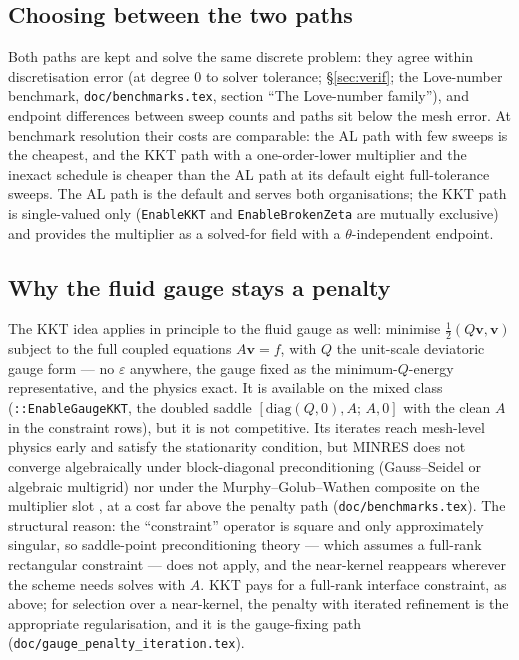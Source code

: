 \documentclass[11pt]{article}
\newcommand{\eps}{\varepsilon}
\newcommand{\bv}{\mathbf{v}}
\begin{document}
\subsection{Choosing between the two paths}

Both paths are kept and solve the same discrete problem: they agree
within discretisation error (at degree 0 to solver tolerance;
\S\ref{sec:verif}; the Love-number benchmark, \texttt{doc/benchmarks.tex},
section ``The Love-number family''), and endpoint differences between
sweep counts and paths sit below the mesh error. At benchmark
resolution their costs are comparable: the AL path with few sweeps is
the cheapest, and the KKT path with a one-order-lower multiplier and the
inexact schedule is cheaper than the AL path at its default eight
full-tolerance sweeps. The AL path is the default and serves both
organisations; the KKT path is single-valued only (\texttt{EnableKKT}
and \texttt{EnableBrokenZeta} are mutually exclusive) and provides the
multiplier as a solved-for field with a $\theta$-independent endpoint.

\subsection{Why the fluid gauge stays a penalty}
\label{sec:gaugekkt}

The KKT idea applies in principle to the fluid gauge as well: minimise
$\tfrac12 (Q\bv, \bv)$ subject to the full coupled equations
$A\bv = f$, with $Q$ the unit-scale deviatoric gauge form --- no $\eps$
anywhere, the gauge fixed as the minimum-$Q$-energy representative, and
the physics exact. It is available on the mixed class
(\texttt{::EnableGaugeKKT},
the doubled saddle $[\mathrm{diag}(Q,0), A;\, A, 0]$ with the clean $A$
in the constraint rows), but it is not competitive. Its iterates reach
mesh-level physics early and satisfy the stationarity condition, but
MINRES does not converge algebraically under block-diagonal
preconditioning (Gauss--Seidel or algebraic multigrid) nor under the
Murphy--Golub--Wathen composite on the multiplier slot
\cite{MurphyGolubWathen2000}, at a cost far above the penalty path
(\texttt{doc/benchmarks.tex}). The structural reason: the
``constraint'' operator is square and only approximately singular, so
saddle-point preconditioning theory --- which assumes a full-rank
rectangular constraint --- does not apply, and the near-kernel
reappears wherever the scheme needs solves with $A$. KKT pays for a
full-rank interface constraint, as above; for selection over a
near-kernel, the penalty with iterated refinement is the appropriate
regularisation, and it is the gauge-fixing path
(\texttt{doc/gauge\_penalty\_iteration.tex}).
\end{document}
